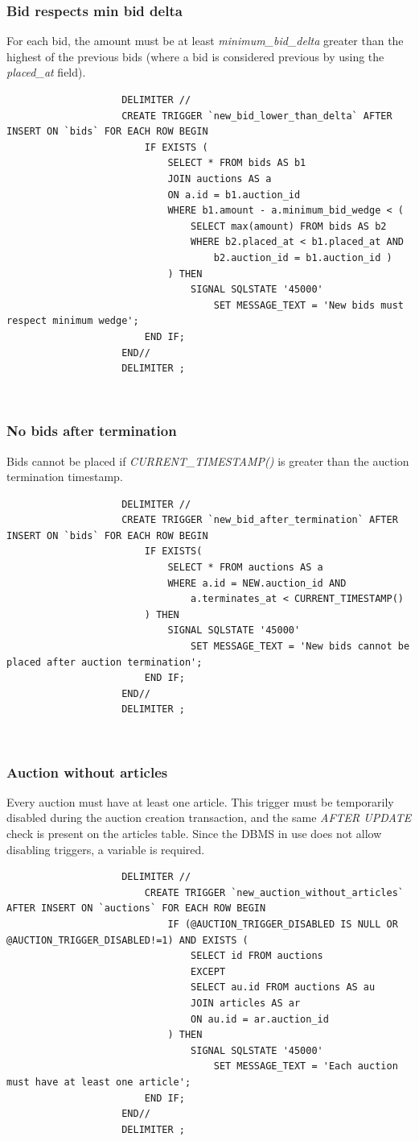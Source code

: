 \documentclass[12pt, a4paper, renqo, final]{amsart}
\begin{document}
				\subsubsection{Bid respects min bid delta} For each bid, the amount must be at least \textit{minimum\_bid\_delta} greater than the highest of the previous bids (where a bid is considered previous by using the \textit{placed\_at} field).
				\begin{lstlisting}
					DELIMITER //
					CREATE TRIGGER `new_bid_lower_than_delta` AFTER INSERT ON `bids` FOR EACH ROW BEGIN
						IF EXISTS (
							SELECT * FROM bids AS b1
							JOIN auctions AS a
							ON a.id = b1.auction_id
							WHERE b1.amount - a.minimum_bid_wedge < (
								SELECT max(amount) FROM bids AS b2
								WHERE b2.placed_at < b1.placed_at AND
									b2.auction_id = b1.auction_id )
							) THEN
								SIGNAL SQLSTATE '45000'
									SET MESSAGE_TEXT = 'New bids must respect minimum wedge';
						END IF;
					END//
					DELIMITER ;
				\end{lstlisting}
				\phantom{.}\\

				\subsubsection{No bids after termination} Bids cannot be placed if \textit{CURRENT\_TIMESTAMP()} is greater than the auction termination timestamp.
				\begin{lstlisting}
					DELIMITER //
					CREATE TRIGGER `new_bid_after_termination` AFTER INSERT ON `bids` FOR EACH ROW BEGIN
						IF EXISTS(
							SELECT * FROM auctions AS a
							WHERE a.id = NEW.auction_id AND
								a.terminates_at < CURRENT_TIMESTAMP()
						) THEN
							SIGNAL SQLSTATE '45000'
								SET MESSAGE_TEXT = 'New bids cannot be placed after auction termination';
						END IF;
					END//
					DELIMITER ;
				\end{lstlisting}
				\phantom{.}\\
				
				\subsubsection{Auction without articles} Every auction must have at least one article. This trigger must be temporarily disabled during the auction creation transaction, and the same \textit{AFTER UPDATE} check is present on the articles table. Since the DBMS in use does not allow disabling triggers, a variable is required.
				\begin{lstlisting}
					DELIMITER //
						CREATE TRIGGER `new_auction_without_articles` AFTER INSERT ON `auctions` FOR EACH ROW BEGIN
							IF (@AUCTION_TRIGGER_DISABLED IS NULL OR @AUCTION_TRIGGER_DISABLED!=1) AND EXISTS (
								SELECT id FROM auctions
								EXCEPT
								SELECT au.id FROM auctions AS au
								JOIN articles AS ar
								ON au.id = ar.auction_id
							) THEN
								SIGNAL SQLSTATE '45000'
									SET MESSAGE_TEXT = 'Each auction must have at least one article';
						END IF;
					END//
					DELIMITER ;
				\end{lstlisting}
\end{document}
